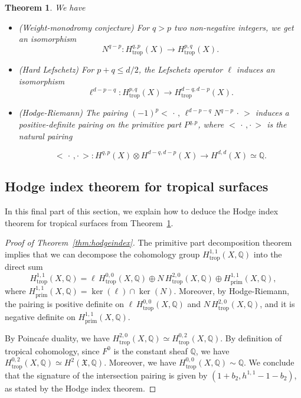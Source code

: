 \documentclass[11pt]{amsart}
\newtheorem{thm}{Theorem}[section]
\theoremstyle{definition}
\numberwithin{equation}{section}
\renewcommand{\~}{\widetilde}
\newcommand{\Q}{\mathbb{Q}}
\newcommand{\ccdot}{\,\cdot\,}
\newcommand{\rdot}{\cdot\,}
\newcommand{\trop}{\mathrm{trop}} %
\newcommand{\prim}{\mathrm{prim}} %
\newcommand{\X}{\mathfrak X}
\begin{document}
\begin{thm}\label{thm:main} We have
\begin{itemize}
\item \emph{(Weight-monodromy conjecture)} For $q>p$ two non-negative integers, we get an isomorphism
\[N^{q-p} \colon H_{\trop}^{q,p}(X) \to H_{\trop}^{p,q}(X).\]

\item \emph{(Hard Lefschetz)} For $p+q \leq d/2$, the Lefschetz operator $\ell$ induces an isomorphism
\[\ell^{d- p-q}\colon H_{\trop}^{p,q}(X) \to H^{d-q, d-p}_{\trop}(X).\]

\item \emph{(Hodge-Riemann)} The pairing $(-1)^p \bigl< \ccdot,\, \ell^{d-p-q} N^{q-p} \ccdot \bigr>$ induces a positive-definite pairing on the primitive part $P^{q,p}$, where $\bigl< \ccdot,\rdot \bigr>$ is the natural pairing

\[\bigl< \ccdot, \rdot\bigr> \colon H^{q,p}(X) \otimes H^{d-q,d-p}(X) \to H^{d,d}(X) \simeq \mathbb Q.\]
\end{itemize}
\end{thm}



\subsection{Hodge index theorem for tropical surfaces}
In this final part of this section, we explain how to deduce the Hodge index theorem for tropical surfaces from Theorem~\ref{thm:main}.
\begin{proof}[Proof of Theorem~\ref{thm:hodgeindex}] The primitive part decomposition theorem implies that we can decompose the cohomology group $H^{1,1}_\trop(X, \Q)$ into the direct sum
\[H^{1,1}_\trop(X, \Q) = \ell\, H^{0,0}_\trop(X, \Q) \oplus N\, H^{2,0}_\trop(X, \Q) \oplus H^{1,1}_\prim(X, \Q),\]
where $H^{1,1}_\prim(X, \Q) = \ker(\ell) \cap \ker(N)$. Moreover, by Hodge-Riemann, the pairing is positive definite on
$\ell\, H^{0,0}_\trop(X, \Q)$ and $N\, H^{2,0}_\trop(X, \Q)$, and it is negative definite on $H^{1,1}_\prim(X, \Q)$.

By Poinca\'re duality, we have $H^{2,0}_\trop(X, \Q) \simeq H^{0,2}_\trop(X, \Q)$. By definition of tropical cohomology, since $F^0$ is the constant sheaf $\Q$, we have $H^{0,2}_\trop(X, \Q) \simeq H^2(\X,\Q)$. Moreover, we have $H^{0,0}_\trop(X, \Q) \sim \Q$.
We conclude that the signature of the intersection pairing is given by $(1+ b_2, h^{1,1}- 1-b_2)$, as stated by the Hodge index theorem.
\end{proof}
\end{document}
